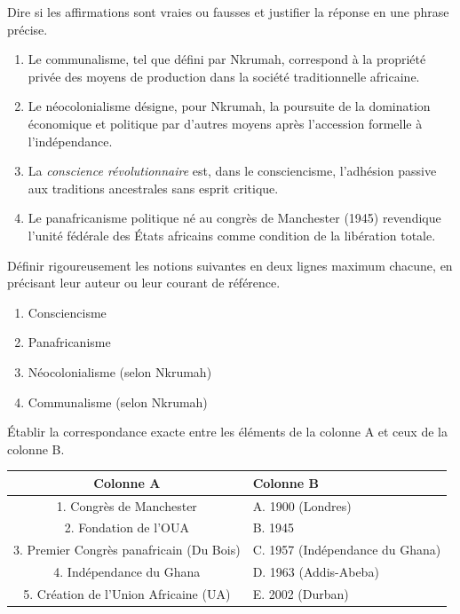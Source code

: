 \documentclass[11pt]{article}
\begin{document}
\begin{exercice}
Dire si les affirmations sont vraies ou fausses et justifier la réponse en une phrase précise.
\begin{enumerate}
\item Le communalisme, tel que défini par Nkrumah, correspond à la propriété privée des moyens de production dans la société traditionnelle africaine.
\item Le néocolonialisme désigne, pour Nkrumah, la poursuite de la domination économique et politique par d'autres moyens après l'accession formelle à l'indépendance.
\item La \emph{conscience révolutionnaire} est, dans le consciencisme, l'adhésion passive aux traditions ancestrales sans esprit critique.
\item Le panafricanisme politique né au congrès de Manchester (1945) revendique l'unité fédérale des États africains comme condition de la libération totale.
\end{enumerate}
\end{exercice}

\begin{exercice}
Définir rigoureusement les notions suivantes en deux lignes maximum chacune, en précisant leur auteur ou leur courant de référence.
\begin{enumerate}
\item Consciencisme
\item Panafricanisme
\item Néocolonialisme (selon Nkrumah)
\item Communalisme (selon Nkrumah)
\end{enumerate}
\end{exercice}

\begin{exercice}
Établir la correspondance exacte entre les éléments de la colonne A et ceux de la colonne B.
\begin{center}
\begin{tabularx}{\linewidth}{|c|X|}\hline
\textbf{Colonne A} & \textbf{Colonne B} \\ \hline
1. Congrès de Manchester & A. 1900 (Londres) \\ \hline
2. Fondation de l'OUA & B. 1945 \\ \hline
3. Premier Congrès panafricain (Du Bois) & C. 1957 (Indépendance du Ghana) \\ \hline
4. Indépendance du Ghana & D. 1963 (Addis-Abeba) \\ \hline
5. Création de l'Union Africaine (UA) & E. 2002 (Durban) \\ \hline
\end{tabularx}
\end{center}
\end{exercice}
\end{document}
